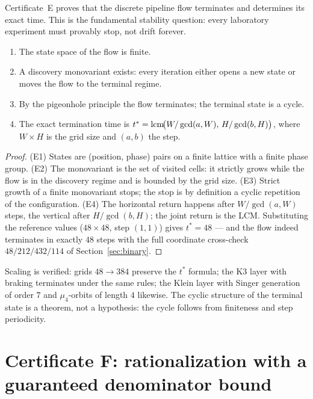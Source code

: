 Certificate~E proves that the discrete pipeline flow terminates and
determines its exact time. This is the fundamental stability
question: every laboratory experiment must provably stop, not drift
forever.

\begin{theorem}[E1--E4: termination]\label{th:E}
\begin{enumerate}[leftmargin=2em, itemsep=0.15em]
\item[(E1)] The state space of the flow is finite.
\item[(E2)] A discovery monovariant exists: every iteration either
  opens a new state or moves the flow to the terminal regime.
\item[(E3)] By the pigeonhole principle the flow terminates; the
  terminal state is a cycle.
\item[(E4)] The exact termination time is
  $t^*=\operatorname{lcm}\!\bigl(W/\gcd(a,W),\, H/\gcd(b,H)\bigr)$,
  where $W\times H$ is the grid size and $(a,b)$ the step.
\end{enumerate}
\end{theorem}

\begin{proof}
(E1) States are (position, phase) pairs on a finite lattice with a
finite phase group. (E2) The monovariant is the set of visited
cells: it strictly grows while the flow is in the discovery regime
and is bounded by the grid size. (E3) Strict growth of a finite
monovariant stops; the stop is by definition a cyclic repetition of
the configuration. (E4) The horizontal return happens after
$W/\gcd(a,W)$ steps, the vertical after $H/\gcd(b,H)$; the joint
return is the LCM. Substituting the reference values ($48\times48$,
step $(1,1)$) gives $t^*=48$ --- and the flow indeed terminates in
exactly $48$ steps with the full coordinate cross-check $48/212/
432/114$ of Section~\ref{sec:binary}.
\end{proof}

Scaling is verified: grids $48\to384$ preserve the $t^*$ formula;
the K3 layer with braking terminates under the same rules; the Klein
layer with Singer generation of order $7$ and $\mu_4$-orbits of
length $4$ likewise. The cyclic structure of the terminal state is a
theorem, not a hypothesis: the cycle follows from finiteness and
step periodicity.

\section{Certificate F: rationalization with a guaranteed
denominator bound}\label{sec:certF}

